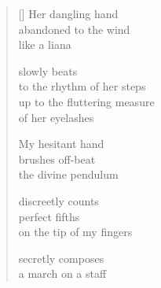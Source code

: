 \documentclass[11pt,a4paper]{article}
\begin{document}
\thispagestyle{empty}

\poemtitle{}

\settowidth{\versewidth}{up to the fluttering measure}

\bigskip

\begin{verse}[\versewidth]
  Her dangling hand \\
  abandoned to the wind \\
  like a liana

  slowly beats \\
  to the rhythm of her steps \\
  up to the fluttering measure \\
  of her eyelashes

  My hesitant hand \\
  brushes off-beat \\
  the divine pendulum

  discreetly counts \\
  perfect fifths \\
  on the tip of my fingers

  secretly composes \\
  a march on a staff
  \end{verse}
\end{document}
